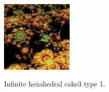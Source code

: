\documentclass[suppldata, dvipdfmx]{interact}
\theoremstyle{plain}%
\theoremstyle{definition}
\theoremstyle{remark}
\theoremstyle{problemstyle}
\begin{document}
\begin{figure}[H]
\begin{minipage}{0.5\textwidth}
\begin{minipage}[t]{0.24\textwidth}
  \end{minipage}
  \hspace*{\fill}
  \begin{minipage}[t]{0.24\textwidth}
   \centering
   \includegraphics[width=1.35in, height=1.35in,
   keepaspectratio]{./img/sphairahedron/hexahedralCake3/limitsetInf_a.jpg} 
   \label{fig:cake3infiniteLimitsetType1}
  \end{minipage}
  \hspace*{\fill}
  \caption{Infinite hexahedral cake3 type 1.}
  \label{fig:cake3infiniteType1}
 \end{minipage}
\end{figure}
\end{document}
